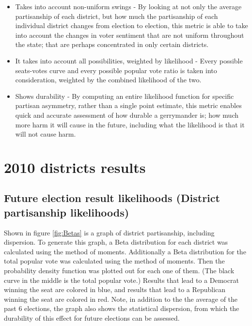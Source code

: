 \documentclass[preprint,12pt]{article}
\begin{document}
\begin{itemize}

\item Takes into account non-uniform swings - By looking at not only the average partisanship of each district, but how much the partisanship of each individual district changes from election to election, this metric is able to take into account the changes in voter sentiment that are not uniform throughout the state; that are perhaps concentrated in only certain districts.

\item It takes into account all possibilities, weighted by likelihood - Every possible seats-votes curve and every possible popular vote ratio is taken into consideration, weighted by the combined likelihood of the two.

\item Shows durability - By computing an entire likelihood function for specific partisan asymmetry, rather than a single point estimate, this metric enables quick and accurate assessment of how durable a gerrymander is; how much more harm it will cause in the future, including what the likelihood is that it will not cause harm.

\end{itemize}


\section{2010 districts results}
\subsection{Future election result likelihoods (District partisanship likelihoods)}
 
Shown in figure \ref{fig:Betas} is a graph of district partisanship, including dispersion.  To generate this graph, a Beta distribution for each district was calculated using the method of moments.  Additionally a Beta distribution for the total popular vote was calculated using the method of moments.  Then the probability density function was plotted out for each one of them.  (The black curve in the middle is the total popular vote.) Results that lead to a Democrat winning the seat are colored in blue, and results that lead to a Republican winning the seat are colored in red.
Note, in addition to the the average of the past 6 elections, the graph also shows the statistical dispersion, from which the durability of this effect for future elections can be assessed.
\end{document}
